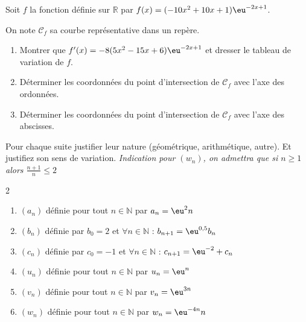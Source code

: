 \documentclass[main.tex]{subfiles}
\begin{document}
 \begin{exercise}\label{chapter06:exercice:exp:derivation9} Soit $f$ la fonction définie sur $\mathbb{R}$ par $f(x) = (-10x^2+10x+1)\eu^{-2x+1}$.
 	
\noindent On note $\mathcal{C}_f$ sa courbe représentative dans un repère.
  \begin{enumerate}[label=\arabic*),leftmargin=*] 
  		\item Montrer que $f'(x)=-8(5x^2-15x+6)\eu^{-2x+1}$ et dresser le tableau de variation de $f$. 
 		\item Déterminer les coordonnées du point d'intersection de $\mathcal{C}_f$ avec l'axe des ordonnées.
 		\item Déterminer les coordonnées du point d'intersection de $\mathcal{C}_f$ avec l'axe des abscisses.
 	\end{enumerate}	
 \end{exercise}
\begin{exercise}\label{chapter06:exercice:exp:suites} 
Pour chaque suite justifier leur nature (géométrique, arithmétique, autre). Et justifiez son sens de variation. \emph{\scriptsize Indication pour $(w_n)$, on admettra que si $n\geqslant 1$ alors $\frac{n+1}{n}\leqslant 2$}
\vspace{-2mm}
\begin{multicols}{2}
  \begin{enumerate}[label=,leftmargin=*]  
\item $(a_n)$ définie pour tout $n\in \mathbb{N}$ par $a_n = \eu^2n$
\item $(b_n)$ définie par $b_0=2$ et $\forall n\in \mathbb{N}$ : $b_{n+1} = \eu^{0,5}b_n$
\item $(c_n)$ définie par $c_0=-1$ et $\forall n\in \mathbb{N}$ : $c_{n+1} = \eu^{-2}+ c_n$  
\item $(u_n)$ définie pour tout $n\in \mathbb{N}$ par $u_n = \eu^n$
\item $(v_n)$ définie pour tout $n\in \mathbb{N}$ par $v_n = \eu^{3n}$
\item $(w_n)$ définie pour tout $n\in \mathbb{N}$ par $w_n = \eu^{-4n}n$ 
\end{enumerate}	 
\end{multicols} 
\end{exercise}
 
 
  
%
\end{document}

